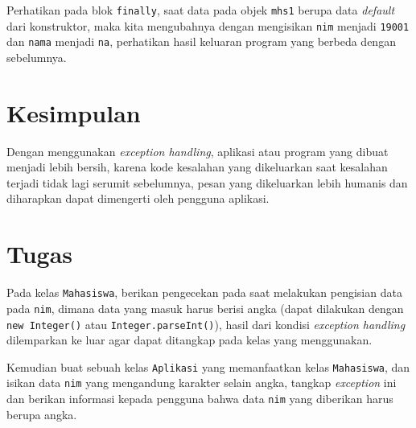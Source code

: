 Perhatikan pada blok \texttt{finally}, saat data pada objek \texttt{mhs1} berupa data \textit{default} dari konstruktor, maka kita mengubahnya dengan mengisikan \texttt{nim} menjadi \texttt{19001} dan \texttt{nama} menjadi \texttt{na}, perhatikan hasil keluaran program yang berbeda dengan sebelumnya.

\section{Kesimpulan}

Dengan menggunakan \textit{exception handling}, aplikasi atau program yang dibuat menjadi lebih bersih, karena kode kesalahan yang dikeluarkan saat kesalahan terjadi tidak lagi serumit sebelumnya, pesan yang dikeluarkan lebih humanis dan diharapkan dapat dimengerti oleh pengguna aplikasi.

\section{Tugas}

Pada kelas \texttt{Mahasiswa}, berikan pengecekan pada saat melakukan pengisian data pada \texttt{nim}, dimana data yang masuk harus berisi angka (dapat dilakukan dengan \texttt{new Integer()} atau \texttt{Integer.parseInt()}), hasil dari kondisi \textit{exception handling} dilemparkan ke luar agar dapat ditangkap pada kelas yang menggunakan.

Kemudian buat sebuah kelas \texttt{Aplikasi} yang memanfaatkan kelas \texttt{Mahasiswa}, dan isikan data \texttt{nim} yang mengandung karakter selain angka, tangkap \textit{exception} ini dan berikan informasi kepada pengguna bahwa data \texttt{nim} yang diberikan harus berupa angka.
